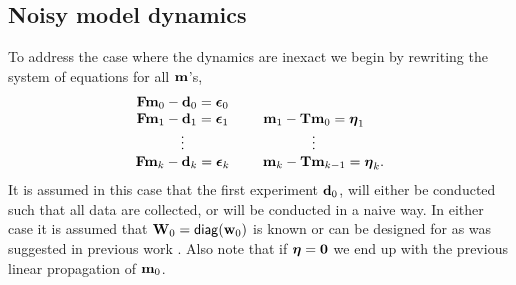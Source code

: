 \documentclass[leqno,onefignum,onetabnum]{siamltexmm}
\newcommand{\bfF}	{{\bf{F}}}
\newcommand{\bfT}	{{\bf{T}}}
\newcommand{\bfW}	{{\bf{W}}}
\newcommand{\bfd}	{{\bf{d}}}
\newcommand{\bfm}	{{\bf{m}}}
\newcommand{\bfw}	{{\bf{w}}}
\newcommand{\bfepsilon} {{\boldsymbol \epsilon}}
\newcommand{\bfeta}     {{\boldsymbol \eta}}
\newcommand {\zero}  {{\bf 0}}
\begin{document}
\subsection{Noisy model dynamics}
\label{sec:Noisy}

To address the case where the dynamics are inexact we begin by  
rewriting the system of equations for all  $\bfm$'s,
\begin{align*}
\label{eq:noisy}
\begin{array}{cc}
\bfF\bfm_{0} - \bfd_0 = \bfepsilon_0 & \\
\bfF\bfm_{1} - \bfd_1 = \bfepsilon_1 & \bfm_1 -\bfT\bfm_0 = \bfeta_1 \\
\vdots & \vdots \\
\bfF\bfm_{k} - \bfd_k = \bfepsilon_k &  \;\;\;\;\;\bfm_k -\bfT\bfm_{k-1} = \bfeta_k.
\end{array}
\end{align*} 
It is  assumed in this case that the first experiment $\bfd_0$, will either be conducted such that all data are collected,  or will be conducted in a naive way.  In either case it is assumed that $\bfW_0 = {\sf diag}(\bfw_0)$ is known
or can be designed for as was suggested in previous work \cite{Haber2011}.
Also note that if $\bfeta = \zero$ we end up with the previous linear propagation of $\bfm_{0}$. 
\end{document}
